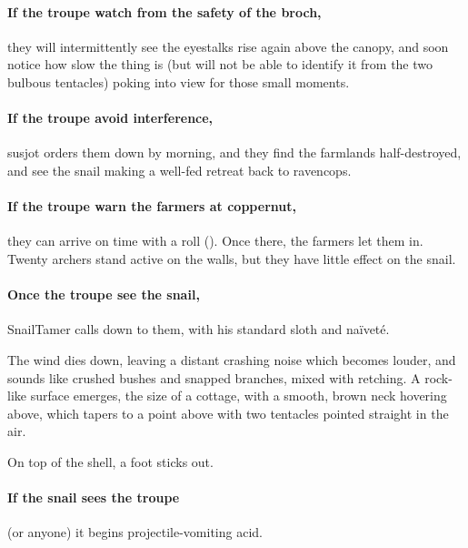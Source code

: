 \paragraph{If the troupe watch from the safety of the \gls{broch},}
they will intermittently see the eyestalks rise again above the canopy, and soon notice how slow the thing is (but will not be able to identify it from the two bulbous tentacles) poking into view for those small moments.

\paragraph{If the troupe avoid interference,}
\gls{susjot} orders them down by morning, and they find the farmlands half-destroyed, and see the snail making a well-fed retreat back to \gls{ravencops}.

\paragraph{If the troupe warn the farmers at \gls{coppernut},}
they can arrive on time with a  roll (\tn[5]).
Once there, the farmers let them in.
Twenty archers stand active on the walls, but they have little effect on the snail.

\paragraph{Once the troupe see the snail,}
\gls{SnailTamer} calls down to them, with his standard sloth and na\"ivet\'e.

\begin{boxtext}
  The wind dies down, leaving a distant crashing noise which becomes louder, and sounds like crushed bushes and snapped branches, mixed with  retching.
  A rock-like surface emerges, the size of a cottage, with a smooth, brown neck hovering above, which tapers to a point above with two tentacles pointed straight in the air.

  On top of the shell, a foot sticks out.
\end{boxtext}

\SnailTamer

\paragraph{If the snail sees the troupe}
(or anyone) it begins projectile-vomiting acid.

\giantSnail

